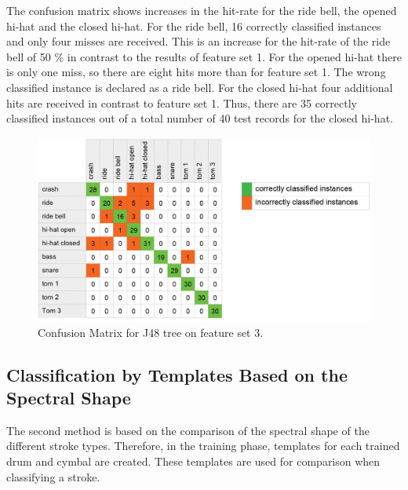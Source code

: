 The confusion matrix shows increases in the hit-rate for the ride bell, the opened hi-hat and the closed hi-hat. For the ride bell, 16 correctly classified instances and only four misses are received. This is an increase for the hit-rate of the ride bell of 50 \% in contrast to the results of feature set 1. For the opened hi-hat there is only one miss, so there are eight hits more than for feature set 1. The wrong classified instance is declared as a ride bell. For the closed hi-hat four additional hits are received in contrast to feature set 1. Thus, there are 35 correctly classified instances out of a total number of 40 test records for the closed hi-hat. 

\begin{figure}[htb]
	\centering
  \includegraphics[width=.65\textwidth]{images/weka/weka_matrix_3.png}
	\caption{Confusion Matrix for J48 tree on feature set 3.}
	\label{fig:wekaMatrix3}
\end{figure}

\subsection{Classification by Templates Based on the Spectral Shape}
\label{section:method2}

The second method is based on the comparison of the spectral shape of the different stroke types. Therefore, in the training phase, templates for each trained drum and cymbal are created. These templates are used for comparison when classifying a stroke.

%
%

